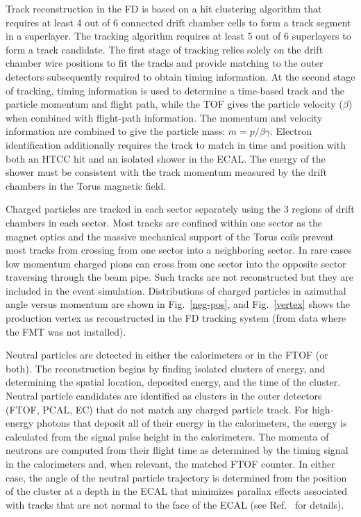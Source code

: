 \documentclass[final,3p,twocolumn]{elsarticle}
\begin{document}
Track reconstruction in the FD is based on a hit clustering algorithm that requires at least 4 out of 6 connected drift
chamber cells to form a track segment in a superlayer.  The tracking algorithm requires at least 5 out of 6 superlayers
to form a track candidate. The first stage of tracking relies solely on the drift chamber wire positions to fit the tracks
and provide matching to the outer detectors subsequently required to obtain timing information. At the second stage
of tracking, timing information is used to determine a time-based track and the particle momentum and flight path,
while the TOF gives the particle velocity ($\beta$) when combined with flight-path information. The momentum and
velocity information are combined to give the particle mass: $m = p/\beta\gamma$. Electron identification additionally
requires the track to match in time and position with both an HTCC hit and an isolated shower in the ECAL. The energy
of the shower must be consistent with the track momentum measured by the drift chambers in the Torus magnetic
field. 

Charged particles are tracked in each sector separately using the 3 regions of drift chambers in each sector. Most
tracks are confined within one sector as the magnet optics and the massive mechanical support of the Torus coils
prevent most tracks from crossing from one sector into a neighboring sector. In rare cases low momentum charged
pions can cross from one sector into the opposite sector traversing through the beam pipe. Such tracks are not
reconstructed but they are included in the event simulation. Distributions of charged particles in azimuthal angle
versus momentum are shown in Fig.~\ref{neg-pos}, and Fig.~\ref{vertex} shows the production vertex as
reconstructed in the FD tracking system (from data where the FMT was not installed).

Neutral particles are detected in either the calorimeters or in the FTOF (or both). The reconstruction begins by
finding isolated clusters of energy, and determining the spatial location, deposited energy, and the time of the
cluster. Neutral particle candidates are identified as clusters in the outer detectors (FTOF, PCAL, EC) that do
not match any charged particle track. For high-energy photons that deposit all of their energy in the calorimeters,
the energy is calculated from the signal pulse height in the calorimeters. The momenta of neutrons are computed
from their flight time as determined by the timing signal in the calorimeters and, when relevant, the matched
FTOF counter. In either case, the angle of the neutral particle trajectory is determined from the position of the
cluster at a depth in the ECAL that minimizes parallax effects associated with tracks that are not normal to the
face of the ECAL (see Ref.~\cite{ECAL} for details).
\end{document}
